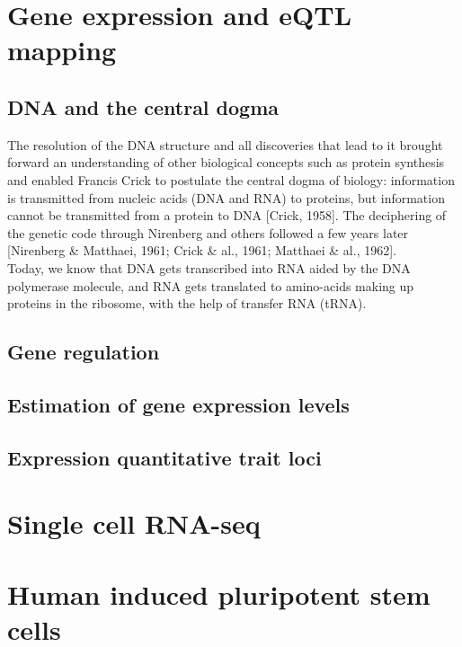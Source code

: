 \section{Gene expression and eQTL mapping}  %

\subsection{DNA and the central dogma}
The resolution of the DNA structure and all discoveries that lead to it brought forward an understanding of other biological concepts such as protein synthesis and enabled Francis Crick to postulate the central dogma of biology: information is transmitted from nucleic acids (DNA and RNA) to proteins, but information cannot be transmitted from a protein to DNA [Crick, 1958]. 
The deciphering of the genetic code through Nirenberg and others followed a few years later [Nirenberg \& Matthaei, 1961; Crick \& al., 1961; Matthaei \& al., 1962].\\

Today, we know that DNA gets transcribed into RNA aided by the DNA polymerase molecule, and RNA gets translated to amino-acids making up proteins in the ribosome, with the help of transfer RNA (tRNA).

\subsection{Gene regulation}
\subsection{Estimation of gene expression levels}
\subsection{Expression quantitative trait loci}

\section{Single cell RNA-seq}  %

\section{Human induced pluripotent stem cells}  %

